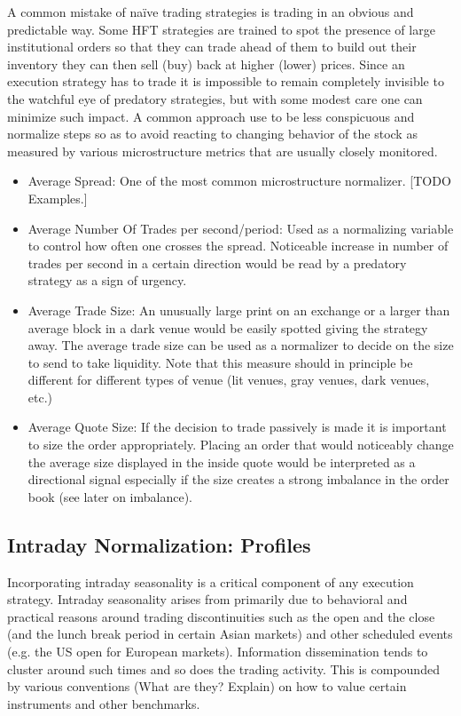 A common mistake of na\"ive trading strategies is trading in an obvious and predictable way. Some HFT strategies are trained to spot the presence of large institutional orders so that they can trade ahead of them to build out their inventory they can then sell (buy) back at higher (lower) prices. Since an execution strategy has to trade it is impossible to remain completely invisible to the watchful eye of predatory strategies, but with some modest care one can minimize such impact. A common approach use to be less conspicuous and normalize steps so as to avoid reacting to changing behavior of the stock as measured by various microstructure metrics that are usually closely monitored.  
	\begin{itemize}
	\item Average Spread: One of the most common microstructure normalizer. [TODO Examples.] 
	\item Average Number Of Trades per second/period: Used as a normalizing variable to control how often one crosses the spread. Noticeable increase in number of trades per second in a certain direction would be read by a predatory strategy as a sign of urgency.
	\item Average Trade Size: An unusually large print on an exchange or a larger than average block in a dark venue would be easily spotted giving the strategy away. The average trade size can be used as a normalizer to decide on the size to send to take liquidity.  Note that this measure should in principle be different for different types of venue (lit venues, gray venues, dark venues, etc.)
	\item Average Quote Size: If the decision to trade passively is made it is important to size the order appropriately. Placing an order that would noticeably change the average size displayed in the inside quote would be interpreted as a directional signal especially if the size creates a strong imbalance in the order book (see later on imbalance).
	\end{itemize}


\subsection{Intraday Normalization: Profiles}

Incorporating intraday seasonality is a critical component of any execution strategy. Intraday seasonality arises from primarily due to behavioral and practical reasons around trading discontinuities such as the open and the close (and the lunch break period in certain Asian markets) and other scheduled events (e.g. the US open for European markets). Information dissemination tends to cluster around such times and so does the trading activity. This is compounded by various conventions (What are they? Explain) on how to value certain instruments and other benchmarks. 
  
